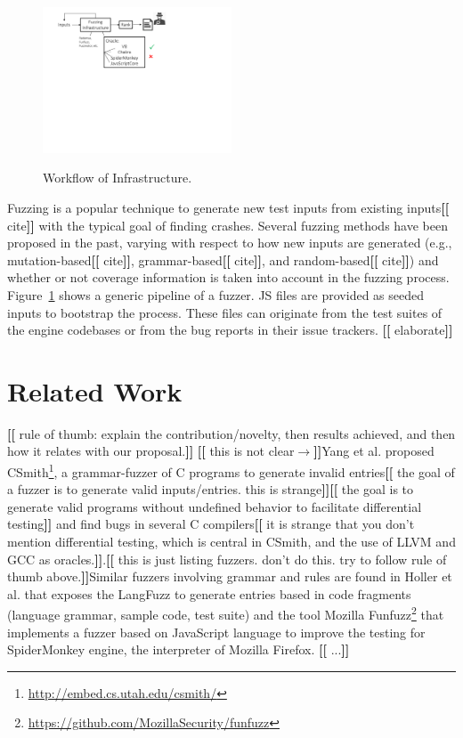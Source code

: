 \documentclass[11pt]{article}
\newcommand{\eg}{e.g.}
\newcommand{\Fix}[1]{\textbf{[[}{\color{red} #1}\textbf{]]}}
\newcommand{\Mar}[1]{\textbf{[[}{\color{blue} #1}\textbf{]]}}
\newcommand{\MAB}[1]{\textbf{[[}{\color{darkgreen} #1}\textbf{]]}}
\begin{document}
\begin{figure}
\vspace{-5ex}
  \centering
  \includegraphics[trim=0 350 200 0,clip,width=0.5\textwidth]{google-awards-workflow}
  \label{fig:workflow}
  \caption{Workflow of Infrastructure.}
\end{figure}
Fuzzing is a popular technique to generate new test inputs from
existing inputs\Fix{cite} with the typical goal of finding
crashes. Several fuzzing methods have been proposed in the past,
varying with respect to how new inputs are generated (\eg{},
mutation-based\Fix{cite}, grammar-based\Fix{cite}, and
random-based\Fix{cite}) and whether or not coverage information is
taken into account in the fuzzing process. Figure~\ref{fig:workflow}
shows a generic pipeline of a fuzzer. JS files are provided as seeded
inputs to bootstrap the process. These files can originate from the
test suites of the engine codebases or from the bug reports in their
issue trackers. \Fix{elaborate}

\section{Related Work}

\Mar{rule of thumb: explain the
  contribution/novelty, then results achieved, and then how it relates
with our proposal.}
\Mar{this is not clear$\rightarrow$}Yang et al. \cite{yang-2011-finding} proposed CSmith\footnote{\url{http://embed.cs.utah.edu/csmith/}}, a grammar-fuzzer 
of C programs to generate invalid entries\Fix{the goal of a
   fuzzer is to generate valid inputs/entries. this is strange}\MAB{the
  goal is to generate valid programs without undefined behavior to
  facilitate differential testing} and
find bugs in several C compilers\Fix{it is strange that you don't mention differential
  testing, which is central in CSmith, and the use of LLVM and GCC as
  oracles.}.\Mar{this is just listing fuzzers. don't do this. try to
  follow rule of thumb above.}Similar fuzzers involving grammar and rules are found in Holler et al. \cite{holler-2012-fuzzing} 
that exposes the LangFuzz to generate entries based in code fragments 
(language grammar, sample code, test suite) and the tool Mozilla 
Funfuzz\footnote{\url{https://github.com/MozillaSecurity/funfuzz}}
that implements a fuzzer based on JavaScript language to improve the 
testing for SpiderMonkey engine, the interpreter of Mozilla Firefox.
\Fix{...}
\end{document}
